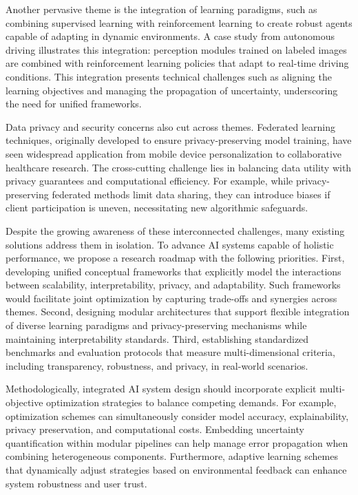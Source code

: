 \documentclass[sigconf]{acmart}
\begin{document}
Another pervasive theme is the integration of learning paradigms, such as combining supervised learning with reinforcement learning to create robust agents capable of adapting in dynamic environments. A case study from autonomous driving illustrates this integration: perception modules trained on labeled images are combined with reinforcement learning policies that adapt to real-time driving conditions. This integration presents technical challenges such as aligning the learning objectives and managing the propagation of uncertainty, underscoring the need for unified frameworks.

Data privacy and security concerns also cut across themes. Federated learning techniques, originally developed to ensure privacy-preserving model training, have seen widespread application from mobile device personalization to collaborative healthcare research. The cross-cutting challenge lies in balancing data utility with privacy guarantees and computational efficiency. For example, while privacy-preserving federated methods limit data sharing, they can introduce biases if client participation is uneven, necessitating new algorithmic safeguards.

Despite the growing awareness of these interconnected challenges, many existing solutions address them in isolation. To advance AI systems capable of holistic performance, we propose a research roadmap with the following priorities. First, developing unified conceptual frameworks that explicitly model the interactions between scalability, interpretability, privacy, and adaptability. Such frameworks would facilitate joint optimization by capturing trade-offs and synergies across themes. Second, designing modular architectures that support flexible integration of diverse learning paradigms and privacy-preserving mechanisms while maintaining interpretability standards. Third, establishing standardized benchmarks and evaluation protocols that measure multi-dimensional criteria, including transparency, robustness, and privacy, in real-world scenarios.

Methodologically, integrated AI system design should incorporate explicit multi-objective optimization strategies to balance competing demands. For example, optimization schemes can simultaneously consider model accuracy, explainability, privacy preservation, and computational costs. Embedding uncertainty quantification within modular pipelines can help manage error propagation when combining heterogeneous components. Furthermore, adaptive learning schemes that dynamically adjust strategies based on environmental feedback can enhance system robustness and user trust.
\end{document}
